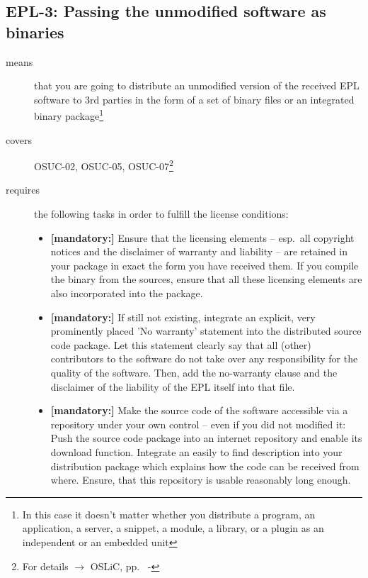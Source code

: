 \subsection{EPL-3: Passing the unmodified software as binaries} 

\begin{description}
\item[means] that you are going to distribute an unmodified version of the
received EPL software to 3rd parties in the form of a set of binary files or an
integrated bi\-na\-ry package\footnote{In this case it doesn't matter
whether you  distribute a program, an application, a server, a snippet, a
module, a library, or a plugin as an independent or an embedded unit}

\item[covers] OSUC-02, OSUC-05, OSUC-07\footnote{For details $\rightarrow$ OSLiC, pp.\
\pageref{OSUC-02-DEF} - \pageref{OSUC-07-DEF}}

\item[requires] the following tasks in order to fulfill the license conditions:
\begin{itemize}
  
  \item \textbf{[mandatory:]} Ensure that the licensing elements -- esp.\ all
  copyright notices and the disclaimer of warranty and liability -- are retained
  in your package in exact the form you have received them. If you compile the
  binary from the sources, ensure that all these licensing elements are also
  incorporated into the package.
  
  \item \textbf{[mandatory:]} If still not existing, integrate an explicit, very
  prominently placed 'No warranty' statement into the distributed source code
  package. Let this statement clearly say that all (other) contributors to the
  software do not take over any responsibility for the quality of the software.
  Then, add the no-warranty clause and the disclaimer of the liability of the
  EPL itself into that file.

  \item \textbf{[mandatory:]} Make the source code of the software accessible
  via a repository under your own control -- even if you did not modified it:
  Push the source code package into an internet repository and enable its
  download function. Integrate an easily to find description into your
  distribution package which explains how the code can be received from where.
  Ensure, that this repository is usable reasonably long enough.
  

\end{itemize}
\end{description}
